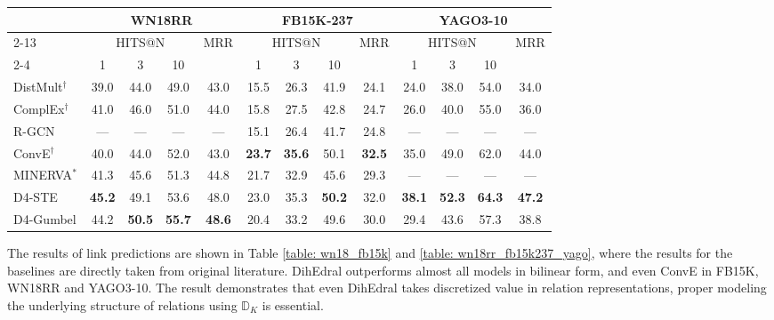 \documentclass[11pt,a4paper]{article}
\begin{document}
\begin{table*}[h]
\begin{tabular}{lcccc|cccc|cccc}
\bottomrule
\multicolumn{1}{l}{\multirow{3}{*}{}} & \multicolumn{4}{c|}{WN18RR} & \multicolumn{4}{c|}{FB15K-237} & \multicolumn{4}{c}{YAGO3-10} \\ 
\cline{2-13} 
\multicolumn{1}{l}{} & \multicolumn{3}{c}{HITS@N} & \multicolumn{1}{l|}{\multirow{2}{*}{MRR}} & \multicolumn{3}{c}{HITS@N} & \multicolumn{1}{l|}{\multirow{2}{*}{MRR}} & \multicolumn{3}{c}{HITS@N} & \multirow{2}{*}{MRR} \\ 
\cline{2-4} \cline{6-8} \cline{10-12}
\multicolumn{1}{l}{} & 1 & 3 & 10 & \multicolumn{1}{l|}{} & 1 & 3 & 10 & \multicolumn{1}{l|}{} & 1 & 3 & 10 &  \\
\hline
DistMult$^{\dagger}$ & 39.0 & 44.0 & 49.0 & 43.0 & 15.5 & 26.3 & 41.9 & 24.1 & 24.0 & 38.0 & 54.0 & 34.0\\
ComplEx$^{\dagger}$ & 41.0 & 46.0 & 51.0 & 44.0 & 15.8 & 27.5 & 42.8 & 24.7 & 26.0 & 40.0 & 55.0 & 36.0\\
\hline
R-GCN & --- & --- & --- & --- & 15.1 & 26.4 & 41.7 & 24.8 & --- & --- & --- & --- \\
ConvE$^{\dagger}$ & 40.0 & 44.0 & 52.0 & 43.0 & \textbf{23.7} & \textbf{35.6} & 50.1 & \textbf{32.5} & 35.0 & 49.0 & 62.0 & 44.0\\
MINERVA$^{*}$ & 41.3 & 45.6 & 51.3 & 44.8 & 21.7 & 32.9 & 45.6 & 29.3 & --- & --- & --- & --- \\
\hline
D4-STE & \textbf{45.2} & {49.1} & {53.6} & {48.0} & 23.0 & 35.3 & \textbf{50.2} & 32.0 & \textbf{38.1} & \textbf{52.3} & \textbf{64.3}  & \textbf{47.2} \\
D4-Gumbel & 44.2 & \textbf{50.5} & \textbf{55.7} & \textbf{48.6} & 20.4 & 33.2 & 49.6 & 30.0 & 29.4 & 43.6 & 57.3 & 38.8 \\
\toprule
\end{tabular}
\caption{Link prediction results on WN18RR and FB15K-237 datasets. Results marked by `$\dagger$' are taken from \cite{convE}, and result marked by `$*$' is taken from \cite{minerva}.} \label{table: wn18rr_fb15k237_yago}
\end{table*}

 The results of link predictions are shown in Table \ref{table: wn18_fb15k} and \ref{table: wn18rr_fb15k237_yago}, where the results for the baselines are directly taken from original literature. DihEdral outperforms almost all models in bilinear form, and even ConvE in FB15K, WN18RR and YAGO3-10. The result demonstrates that even DihEdral takes discretized value in relation representations, proper modeling the underlying structure of relations using $\mathbb{D}_K$ is essential.
 
\end{document}
